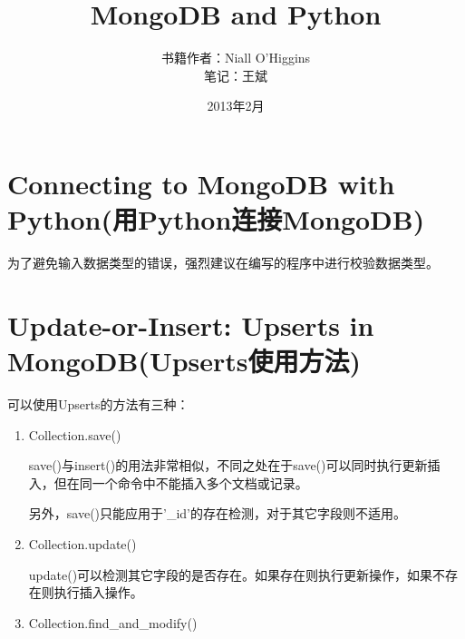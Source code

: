 \documentclass[openany][a4paper,11pt]{book}
\begin{document}
  
\begin{spacing}{1.2}        %
\renewcommand\arraystretch{1.5} %
\begin{CJK}{UTF8}{gbsn}     %
\newcommand{\tabincell}[2]{\begin{tabular}{@{}#1@{}}#2\end{tabular}}
\pagestyle{empty}               
\begin{Huge}
\title{\bf MongoDB and Python}      %
\end{Huge}
\author{书籍作者：Niall O’Higgins \\ 笔记：王斌}
\date{2013年2月}

\maketitle                      %
\tableofcontents                %
\thispagestyle{empty}           %
\newpage
\pagestyle{plain}
\setcounter{page}{1}
\newpage
\section{Connecting to MongoDB with Python(用Python连接MongoDB)}

为了避免输入数据类型的错误，强烈建议在编写的程序中进行校验数据类型。

\newpage
\section{Update-or-Insert: Upserts in MongoDB(Upserts使用方法)}

可以使用Upserts的方法有三种：

\begin{enumerate}
\def\labelenumi{\arabic{enumi}.}
\item
  Collection.save()

  save()与insert()的用法非常相似，不同之处在于save()可以同时执行更新插入，但在同一个命令中不能插入多个文档或记录。

  另外，save()只能应用于'\_id'的存在检测，对于其它字段则不适用。
\item
  Collection.update()

  update()可以检测其它字段的是否存在。如果存在则执行更新操作，如果不存在则执行插入操作。
\item
  Collection.find\_and\_modify()


\end{enumerate}
\end{CJK}
\end{spacing}
\end{document}
